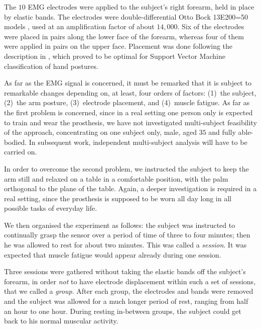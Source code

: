 The $10$ EMG electrodes were applied to the subject's right
forearm, held in place by elastic bands. The electrodes were
double-differential Otto Bock 13E200=50 models \cite{ottobock},
used at an amplification factor of about $14,000$. Six of the
electrodes were placed in pairs along the lower face of the
forearm, whereas four of them were applied in pairs on the upper
face. Placement was done following the description in
\cite{smagt}, which proved to be optimal for Support Vector
Machine classification of hand postures.

As far as the EMG signal is concerned, it must be remarked that it
is subject to remarkable changes depending on, at least, four
orders of factors: (1)~the subject, (2)~the arm posture,
(3)~electrode placement, and (4)~muscle fatigue. As far as the
first problem is concerned, since in a real setting one person
only is expected to train and wear the prosthesis, we have not
investigated multi-subject feasibility of the approach,
concentrating on one subject only, male, aged $35$ and fully
able-bodied. In subsequent work, independent multi-subject
analysis will have to be carried on.

In order to overcome the second problem, we instructed the subject
to keep the arm still and relaxed on a table in a comfortable
position, with the palm orthogonal to the plane of the table.
Again, a deeper investigation is required in a real setting, since
the prosthesis is supposed to be worn all day long in all possible
tasks of everyday life.
%

We then organised the experiment as follows: the subject was
instructed to continually grasp the sensor over a period of time of
three to four minutes; then he was allowed to rest for about two
minutes. This was called a \emph{session}. It was expected that muscle
fatigue would appear already during one session.

Three sessions were gathered without taking the elastic bands off the
subject's forearm, in order \emph{not} to have electrode displacement
within such a set of sessions, that we called a \emph{group}. After
each group, the electrodes and bands were removed and the subject was
allowed for a much longer period of rest, ranging from half an hour to
one hour. During resting in-between groups, the subject could get back
to his normal muscular activity.

